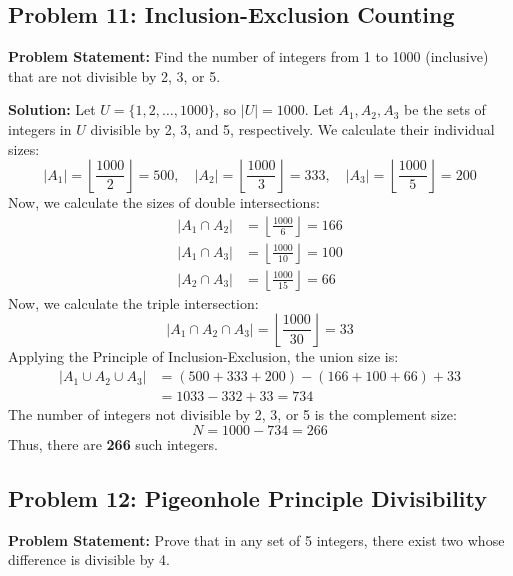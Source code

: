 \documentclass[10pt,journal,compsoc,onecolumn]{IEEEtran}
\begin{document}
\subsection{Problem 11: Inclusion-Exclusion Counting}

\textbf{Problem Statement:}
Find the number of integers from 1 to 1000 (inclusive) that are not divisible by 2, 3, or 5.

\textbf{Solution:}
Let $U = \{1, 2, \ldots, 1000\}$, so $|U| = 1000$.
Let $A_1, A_2, A_3$ be the sets of integers in $U$ divisible by 2, 3, and 5, respectively.
We calculate their individual sizes:
\begin{equation}
|A_1| = \left\lfloor \frac{1000}{2} \right\rfloor = 500, \quad |A_2| = \left\lfloor \frac{1000}{3} \right\rfloor = 333, \quad |A_3| = \left\lfloor \frac{1000}{5} \right\rfloor = 200
\end{equation}
Now, we calculate the sizes of double intersections:
\begin{align}
|A_1 \cap A_2| &= \left\lfloor \frac{1000}{6} \right\rfloor = 166 \\
|A_1 \cap A_3| &= \left\lfloor \frac{1000}{10} \right\rfloor = 100 \\
|A_2 \cap A_3| &= \left\lfloor \frac{1000}{15} \right\rfloor = 66
\end{align}
Now, we calculate the triple intersection:
\begin{equation}
|A_1 \cap A_2 \cap A_3| = \left\lfloor \frac{1000}{30} \right\rfloor = 33
\end{equation}
Applying the Principle of Inclusion-Exclusion, the union size is:
\begin{align}
\left| A_1 \cup A_2 \cup A_3 \right| &= (500 + 333 + 200) - (166 + 100 + 66) + 33 \\
&= 1033 - 332 + 33 = 734
\end{align}
The number of integers not divisible by 2, 3, or 5 is the complement size:
\begin{equation}
N = 1000 - 734 = 266
\end{equation}
Thus, there are \textbf{266} such integers.

\subsection{Problem 12: Pigeonhole Principle Divisibility}

\textbf{Problem Statement:}
Prove that in any set of 5 integers, there exist two whose difference is divisible by 4.
\end{document}
